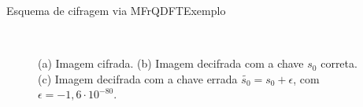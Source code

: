 \documentclass[10pt,compress]{beamer}
\begin{document}
\begin{frame}{Esquema de cifragem via MFrQDFT}{Exemplo}
\begin{figure}
\centering
{}~
~
~
\caption{(a) Imagem cifrada. (b) Imagem decifrada com a chave $ s_0 $ correta. (c) Imagem decifrada com a chave errada $ \widetilde{s_0} = s_0 + \epsilon $, com $ \epsilon = -1{,}6 \cdot 10^{-80} $.}
\end{figure}
\end{frame}
\end{document}
